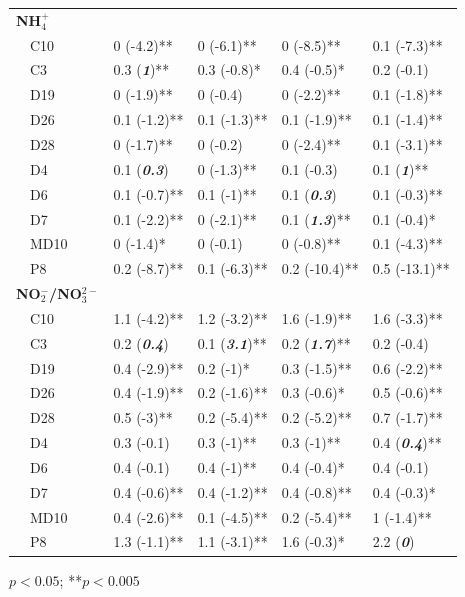 \documentclass[journal = esthag, manuscript = article]{achemso}\usepackage[]{graphicx}\usepackage[]{color}
\begin{document}
\begin{suppinfo}
\begin{table}[!tbp]
\begin{center}
\begin{tabular}{lllll}
\hline
{\bfseries NH$_{4}^{+}$}&&&&\tabularnewline
~~C10&0 \footnotesize{(-4.2)**}&0 \footnotesize{(-6.1)**}&0 \footnotesize{(-8.5)**}&0.1 \footnotesize{(-7.3)**}\tabularnewline
~~C3&0.3 \footnotesize{(\textit{\textbf{1}})**}&0.3 \footnotesize{(-0.8)*}&0.4 \footnotesize{(-0.5)*}&0.2 \footnotesize{(-0.1)}\tabularnewline
~~D19&0 \footnotesize{(-1.9)**}&0 \footnotesize{(-0.4)}&0 \footnotesize{(-2.2)**}&0.1 \footnotesize{(-1.8)**}\tabularnewline
~~D26&0.1 \footnotesize{(-1.2)**}&0.1 \footnotesize{(-1.3)**}&0.1 \footnotesize{(-1.9)**}&0.1 \footnotesize{(-1.4)**}\tabularnewline
~~D28&0 \footnotesize{(-1.7)**}&0 \footnotesize{(-0.2)}&0 \footnotesize{(-2.4)**}&0.1 \footnotesize{(-3.1)**}\tabularnewline
~~D4&0.1 \footnotesize{(\textit{\textbf{0.3}})}&0 \footnotesize{(-1.3)**}&0.1 \footnotesize{(-0.3)}&0.1 \footnotesize{(\textit{\textbf{1}})**}\tabularnewline
~~D6&0.1 \footnotesize{(-0.7)**}&0.1 \footnotesize{(-1)**}&0.1 \footnotesize{(\textit{\textbf{0.3}})}&0.1 \footnotesize{(-0.3)**}\tabularnewline
~~D7&0.1 \footnotesize{(-2.2)**}&0 \footnotesize{(-2.1)**}&0.1 \footnotesize{(\textit{\textbf{1.3}})**}&0.1 \footnotesize{(-0.4)*}\tabularnewline
~~MD10&0 \footnotesize{(-1.4)*}&0 \footnotesize{(-0.1)}&0 \footnotesize{(-0.8)**}&0.1 \footnotesize{(-4.3)**}\tabularnewline
~~P8&0.2 \footnotesize{(-8.7)**}&0.1 \footnotesize{(-6.3)**}&0.2 \footnotesize{(-10.4)**}&0.5 \footnotesize{(-13.1)**}\tabularnewline
\hline
{\bfseries NO$_{2}^{-}$/NO$_{3}^{2-}$}&&&&\tabularnewline
~~C10&1.1 \footnotesize{(-4.2)**}&1.2 \footnotesize{(-3.2)**}&1.6 \footnotesize{(-1.9)**}&1.6 \footnotesize{(-3.3)**}\tabularnewline
~~C3&0.2 \footnotesize{(\textit{\textbf{0.4}})}&0.1 \footnotesize{(\textit{\textbf{3.1}})**}&0.2 \footnotesize{(\textit{\textbf{1.7}})**}&0.2 \footnotesize{(-0.4)}\tabularnewline
~~D19&0.4 \footnotesize{(-2.9)**}&0.2 \footnotesize{(-1)*}&0.3 \footnotesize{(-1.5)**}&0.6 \footnotesize{(-2.2)**}\tabularnewline
~~D26&0.4 \footnotesize{(-1.9)**}&0.2 \footnotesize{(-1.6)**}&0.3 \footnotesize{(-0.6)*}&0.5 \footnotesize{(-0.6)**}\tabularnewline
~~D28&0.5 \footnotesize{(-3)**}&0.2 \footnotesize{(-5.4)**}&0.2 \footnotesize{(-5.2)**}&0.7 \footnotesize{(-1.7)**}\tabularnewline
~~D4&0.3 \footnotesize{(-0.1)}&0.3 \footnotesize{(-1)**}&0.3 \footnotesize{(-1)**}&0.4 \footnotesize{(\textit{\textbf{0.4}})**}\tabularnewline
~~D6&0.4 \footnotesize{(-0.1)}&0.4 \footnotesize{(-1)**}&0.4 \footnotesize{(-0.4)*}&0.4 \footnotesize{(-0.1)}\tabularnewline
~~D7&0.4 \footnotesize{(-0.6)**}&0.4 \footnotesize{(-1.2)**}&0.4 \footnotesize{(-0.8)**}&0.4 \footnotesize{(-0.3)*}\tabularnewline
~~MD10&0.4 \footnotesize{(-2.6)**}&0.1 \footnotesize{(-4.5)**}&0.2 \footnotesize{(-5.4)**}&1 \footnotesize{(-1.4)**}\tabularnewline
~~P8&1.3 \footnotesize{(-1.1)**}&1.1 \footnotesize{(-3.1)**}&1.6 \footnotesize{(-0.3)*}&2.2 \footnotesize{(\textit{\textbf{0}})}\tabularnewline
\hline
\end{tabular}\end{center}

\footnotesize *$p<0.05$; **$p<0.005$\end{table}



\end{suppinfo}
\end{document}
